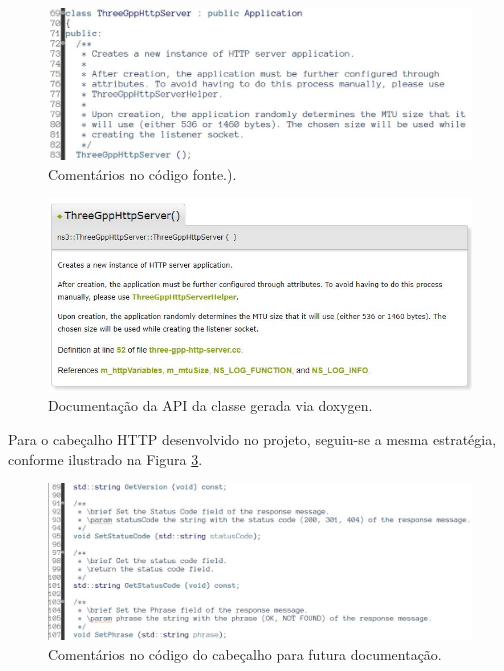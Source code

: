 \begin{figure}
	\centering
	\includegraphics[scale=0.5]{textuais/doxygen-comments.jpg}
	\caption[Comentários no código fonte.]{Comentários no código fonte.).
		\label{fig:doxygen-comments}}
\end{figure}


\begin{figure}
	\centering
	\includegraphics[scale=0.75]{textuais/api-documentation.jpg}
	\caption[Documentação da API da classe gerada via doxygen]{Documentação da API da classe gerada via doxygen.
		\label{fig:api-documentation}}
\end{figure}

Para o cabeçalho HTTP desenvolvido no projeto, seguiu-se a mesma estratégia, conforme ilustrado na Figura \ref{fig:header-comments}. 

\begin{figure}
	\centering
	\includegraphics[scale=0.45]{textuais/header-comments.jpg}
	\caption[Comentários no código do cabeçalho para futura documentação.]{Comentários no código do cabeçalho para futura documentação.
		\label{fig:header-comments}}
\end{figure}

